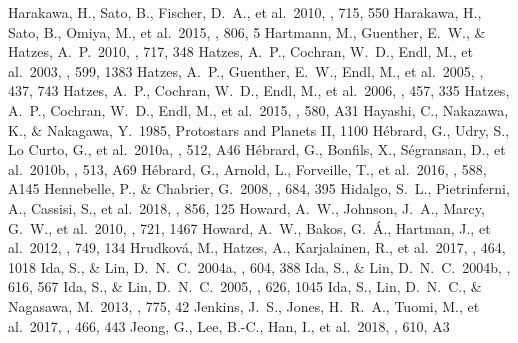 \documentclass[twocolumn]{aastex62}
\begin{document}
\begin{CJK*}{UTF8}{min}
\begin{thebibliography}{}
 Harakawa, H., Sato, B., Fischer, D.~A., et al.\ 2010, \apj, 715, 550
 Harakawa, H., Sato, B., Omiya, M., et al.\ 2015, \apj, 806, 5
 Hartmann, M., Guenther, E.~W., \& Hatzes, A.~P.\ 2010, \apj, 717, 348
 Hatzes, A.~P., Cochran, W.~D., Endl, M., et al.\ 2003, \apj, 599, 1383
 Hatzes, A.~P., Guenther, E.~W., Endl, M., et al.\ 2005, \aap, 437, 743
 Hatzes, A.~P., Cochran, W.~D., Endl, M., et al.\ 2006, \aap, 457, 335
 Hatzes, A.~P., Cochran, W.~D., Endl, M., et al.\ 2015, \aap, 580, A31
 Hayashi, C., Nakazawa, K., \& Nakagawa, Y.\ 1985, Protostars and Planets II, 1100
 H{\'e}brard, G., Udry, S., Lo Curto, G., et al.\ 2010a, \aap, 512, A46
 H{\'e}brard, G., Bonfils, X., S{\'e}gransan, D., et al.\ 2010b, \aap, 513, A69
 H{\'e}brard, G., Arnold, L., Forveille, T., et al.\ 2016, \aap, 588, A145
 Hennebelle, P., \& Chabrier, G.\ 2008, \apj, 684, 395
 Hidalgo, S.~L., Pietrinferni, A., Cassisi, S., et al.\ 2018, \apj, 856, 125
 Howard, A.~W., Johnson, J.~A., Marcy, G.~W., et al.\ 2010, \apj, 721, 1467
 Howard, A.~W., Bakos, G.~{\'A}., Hartman, J., et al.\ 2012, \apj, 749, 134
 Hrudkov{\'a}, M., Hatzes, A., Karjalainen, R., et al.\ 2017, \mnras, 464, 1018
 Ida, S., \& Lin, D.~N.~C.\ 2004a, \apj, 604, 388
 Ida, S., \& Lin, D.~N.~C.\ 2004b, \apj, 616, 567
 Ida, S., \& Lin, D.~N.~C.\ 2005, \apj, 626, 1045
 Ida, S., Lin, D.~N.~C., \& Nagasawa, M.\ 2013, \apj, 775, 42
 Jenkins, J.~S., Jones, H.~R.~A., Tuomi, M., et al.\ 2017, \mnras, 466, 443
 Jeong, G., Lee, B.-C., Han, I., et al.\ 2018, \aap, 610, A3

\end{thebibliography}
\end{CJK*}
\end{document}
